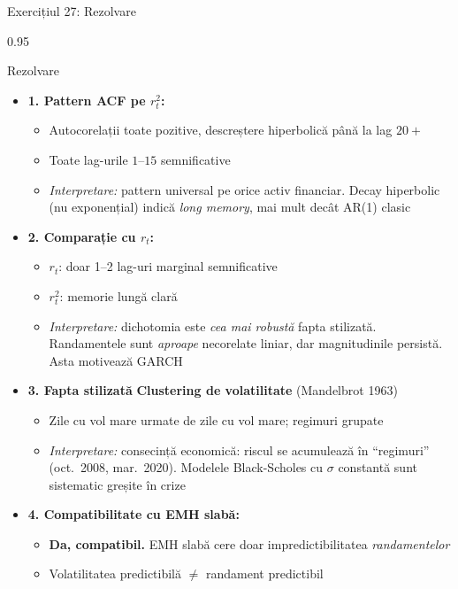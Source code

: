 \documentclass[9pt, aspectratio=169, t]{beamer}
\begin{document}
\begin{frame}[shrink=40]{Exercițiul 27: Rezolvare}
\begin{cminipage}{0.95\textwidth}
\begin{exampleblock}{Rezolvare}
\begin{itemize}\setlength{\itemsep}{0pt}
    \item \textbf{1. Pattern ACF pe $r_t^2$:}
    \begin{itemize}\setlength{\itemsep}{0pt}
        \item Autocorelații toate pozitive, descreștere hiperbolică până la lag $20+$
        \item Toate lag-urile $1$--$15$ semnificative
        \item \textit{Interpretare:} pattern universal pe orice activ financiar. Decay hiperbolic (nu exponențial) indică \emph{long memory}, mai mult decât AR(1) clasic
    \end{itemize}
    \item \textbf{2. Comparație cu $r_t$:}
    \begin{itemize}\setlength{\itemsep}{0pt}
        \item $r_t$: doar 1--2 lag-uri marginal semnificative
        \item $r_t^2$: memorie lungă clară
        \item \textit{Interpretare:} dichotomia este \emph{cea mai robustă} fapta stilizată. Randamentele sunt \emph{aproape} necorelate liniar, dar magnitudinile persistă. Asta motivează GARCH
    \end{itemize}
    \item \textbf{3. Fapta stilizată} \quad \textbf{Clustering de volatilitate} (Mandelbrot 1963)
    \begin{itemize}\setlength{\itemsep}{0pt}
        \item Zile cu vol mare urmate de zile cu vol mare; regimuri grupate
        \item \textit{Interpretare:} consecință economică: riscul se acumulează în ``regimuri'' (oct.\ 2008, mar.\ 2020). Modelele Black-Scholes cu $\sigma$ constantă sunt sistematic greșite în crize
    \end{itemize}
    \item \textbf{4. Compatibilitate cu EMH slabă:}
    \begin{itemize}\setlength{\itemsep}{0pt}
        \item \textbf{Da, compatibil.} EMH slabă cere doar impredictibilitatea \emph{randamentelor}
        \item Volatilitatea predictibilă $\ne$ randament predictibil

\end{itemize}
\end{itemize}
\end{exampleblock}
\end{cminipage}
\end{frame}
\end{document}
